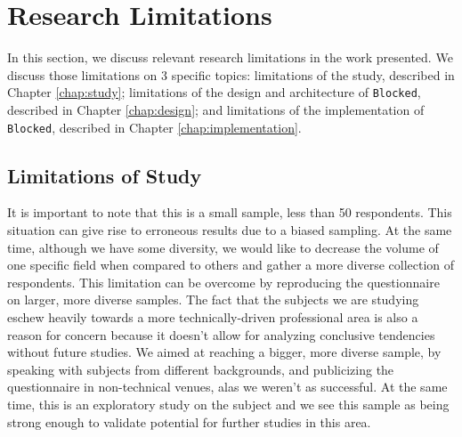 \section{Research Limitations}
\label{sec:eval-limitations}

In this section, we discuss relevant research limitations in the work presented. We discuss those limitations on 3 specific topics: limitations of the study, described in Chapter \ref{chap:study}; limitations of the design and architecture of \texttt{Blocked}, described in Chapter \ref{chap:design}; and limitations of the implementation of \texttt{Blocked}, described in Chapter \ref{chap:implementation}.

\subsection{Limitations of Study}

It is important to note that this is a small sample, less than 50 respondents. This situation can give rise to erroneous results due to a biased sampling. At the same time, although we have some diversity, we would like to decrease the volume of one specific field when compared to others and gather a more diverse collection of respondents. This limitation can be overcome by reproducing the questionnaire on larger, more diverse samples. The fact that the subjects we are studying eschew heavily towards a more technically-driven professional area is also a reason for concern because it doesn't allow for analyzing conclusive tendencies without future studies. We aimed at reaching a bigger, more diverse sample, by speaking with subjects from different backgrounds, and publicizing the questionnaire in non-technical venues, alas we weren't as successful. At the same time, this is an exploratory study on the subject and we see this sample as being strong enough to validate potential for further studies in this area.

